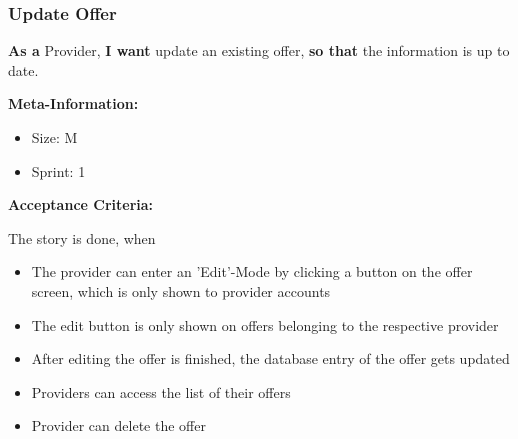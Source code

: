 \subsubsection{Update Offer}

\textbf{As a} Provider,\hfill\break
\textbf{I want} update an existing offer,\hfill\break
\textbf{so that} the information is up to date.

\textbf{Meta-Information:}
\begin{itemize}
    \item Size: M
    \item Sprint: 1
\end{itemize}

\textbf{Acceptance Criteria:}

The story is done, when
\begin{itemize}
    \item The provider can enter an 'Edit'-Mode by clicking a button on the offer screen, which is only shown to provider accounts
    \item The edit button is only shown on offers belonging to the respective provider
    \item After editing the offer is finished, the database entry of the offer gets updated
    \item Providers can access the list of their offers
    \item Provider can delete the offer
\end{itemize}